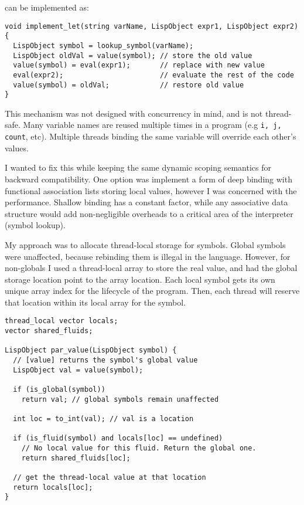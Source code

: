 can be implemented as:

\begin{verbatim}
void implement_let(string varName, LispObject expr1, LispObject expr2) {
  LispObject symbol = lookup_symbol(varName);
  LispObject oldVal = value(symbol); // store the old value
  value(symbol) = eval(expr1);       // replace with new value
  eval(expr2);                       // evaluate the rest of the code
  value(symbol) = oldVal;            // restore old value
}
\end{verbatim}

This mechanism was not designed with concurrency in mind, and is not thread-safe.
Many variable names are reused multiple times in a program (e.g \texttt{i, j, count}, etc).
Multiple threads binding the same variable will override each other's values.

I wanted to fix this while keeping the same dynamic scoping semantics for backward compatibility.
One option was implement a form of deep binding with functional association lists storing local values,
however I was concerned with the performance. Shallow binding has a constant factor, while any
associative data structure would add non-negligible overheads to a critical area of the
interpreter (symbol lookup).

My approach was to allocate thread-local storage for symbols.
Global symbols were unaffected, because rebinding them is illegal in the language.
However, for non-globals I used a thread-local array to store the real value, and had the global storage
location point to the array location. Each local symbol gets its own unique array index for the lifecycle
of the program. Then, each thread will reserve that location within its local array for the symbol.

\begin{verbatim}
thread_local vector locals;
vector shared_fluids;

LispObject par_value(LispObject symbol) {
  // [value] returns the symbol's global value
  LispObject val = value(symbol);

  if (is_global(symbol))
    return val; // global symbols remain unaffected

  int loc = to_int(val); // val is a location

  if (is_fluid(symbol) and locals[loc] == undefined)
    // No local value for this fluid. Return the global one.
    return shared_fluids[loc];

  // get the thread-local value at that location
  return locals[loc];
}
\end{verbatim}

